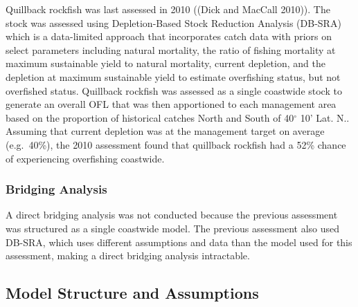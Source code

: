 \documentclass[11pt,
  english,
  a4paper,
]{article}
\begin{document}
Quillback rockfish was last assessed in 2010 ({(Dick and MacCall 2010)\leavevmode\tagmcend\tagstructend}). The stock was assessed using Depletion-Based Stock Reduction Analysis (DB-SRA) which is a data-limited approach that incorporates catch data with priors on select parameters including natural mortality, the ratio of fishing mortality at maximum sustainable yield to natural mortality, current depletion, and the depletion at maximum sustainable yield to estimate overfishing status, but not overfished status. Quillback rockfish was assessed as a single coastwide stock to generate an overall OFL that was then apportioned to each management area based on the proportion of historical catches North and South of 40{\(^\circ\)\leavevmode\tagmcend\tagstructend} 10' Lat. N.. Assuming that current depletion was at the management target on average (e.g.~40\%), the 2010 assessment found that quillback rockfish had a 52\% chance of experiencing overfishing coastwide.

\leavevmode\tagmcend\tagstructend\par


\hypertarget{bridging-analysis}{%
\subsubsection{Bridging Analysis}\label{bridging-analysis}}

\leavevmode\tagmcend\tagstructend


A direct bridging analysis was not conducted because the previous assessment was structured as a single coastwide model. The previous assessment also used DB-SRA, which uses different assumptions and data than the model used for this assessment, making a direct bridging analysis intractable.

\leavevmode\tagmcend\tagstructend\par


\hypertarget{model-structure-and-assumptions}{%
\subsection{Model Structure and Assumptions}\label{model-structure-and-assumptions}}
\end{document}
